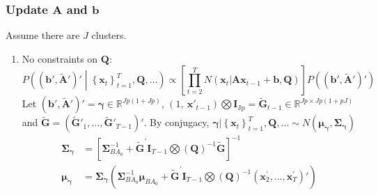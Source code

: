 \documentclass[]{article}
\begin{document}
\subsubsection{Update \(\mathbf{A}\) and \(\mathbf{b}\)}
Assume there are \(J\) clusters.
\begin{enumerate}
	\def\labelenumi{(\arabic{enumi})}
	\item
	No constraints on \(\mathbf{Q}\):
	\[P\left( \left( \mathbf{b}',{\widetilde{\mathbf{A}}'} \right)' \middle| \left\{ \mathbf{x}_{t} \right\}_{t = 1}^{T},\mathbf{Q},\ldots \right) \propto \left\lbrack \prod_{t = 2}^{T}{N\left( \mathbf{x}_{t}|\mathbf{A}\mathbf{x}_{t - 1} + \mathbf{b},\mathbf{Q} \right)} \right\rbrack P\left( \left( \mathbf{b}',{\widetilde{\mathbf{A}}'} \right)' \right)\]
	Let
	\(\left( \mathbf{b'},{\widetilde{\mathbf{A}}'} \right)' = \bm{\gamma} \in \mathbb{R}^{Jp(1 + Jp)}\),
	\(\left( 1,\ {\mathbf{x}'_{t - 1}} \right)\bigotimes\mathbf{I}_{\text{Jp}}\mathbf{=}{\widetilde{\mathbf{G}}}_{t - 1} \in \mathbb{R}^{Jp \times Jp(1 + pJ)}\)
	and
	\(\widetilde{\mathbf{G}} = \left( {\widetilde{\mathbf{G}}'}_{1},\ldots,{\widetilde{\mathbf{G}}'}_{T - 1} \right)'\).
	By conjugacy, \(\bm{\gamma}|\left\{ \mathbf{x}_{t} \right\}_{t = 1}^{T},\mathbf{Q},\ldots \sim N(\bm{\mu}_{\bm{\gamma}},\mathbf{\Sigma}_{\bm{\gamma}})\)
	\begin{align*}
		\mathbf{\Sigma}_{\bm{\gamma}} &= \left\lbrack \mathbf{\Sigma}_{BA_{0}}^{- 1} + {\widetilde{\mathbf{G}}}^{\mathbf{'}}\mathbf{I}_{T - 1}\bigotimes\left( \mathbf{Q} \right)^{- 1}\widetilde{\mathbf{G}} \right\rbrack^{- 1}\\
		\bm{\mu}_{\bm{\gamma}} &= \mathbf{\Sigma}_{\bm{\gamma}}\left( \mathbf{\Sigma}_{BA_{0}}^{- 1}\bm{\mu}_{BA_{0}} + {\widetilde{\mathbf{G}}}^{'}\mathbf{I}_{T - 1}\bigotimes\left( \mathbf{Q} \right)^{- 1}\left( \mathbf{x}_{2}^{'},\ldots,\mathbf{x}_{T}^{'} \right)' \right)
	\end{align*}
	

\end{enumerate}
\end{document}
